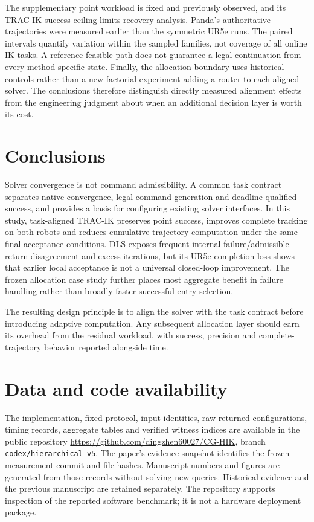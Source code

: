 \documentclass[10pt,a4paper]{article}
\begin{document}
The supplementary point workload is fixed and previously observed, and its
TRAC-IK success ceiling limits recovery analysis. Panda's authoritative
trajectories were measured earlier than the symmetric UR5e runs.
The paired intervals quantify variation within the sampled families, not
coverage of all online IK tasks. A reference-feasible path does not guarantee
a legal continuation from every method-specific state.
Finally, the allocation boundary uses historical controls rather than a new
factorial experiment adding a router to each aligned solver. The conclusions
therefore distinguish directly measured alignment effects from the engineering
judgment about when an additional decision layer is worth its cost.

\section{Conclusions}
\label{sec:conclusions}

Solver convergence is not command admissibility.
A common task contract separates native convergence, legal command generation
and deadline-qualified success, and provides a basis for configuring existing
solver interfaces. In this study, task-aligned TRAC-IK preserves point success,
improves complete tracking on both robots and reduces cumulative trajectory
computation under the same final acceptance conditions. DLS exposes frequent
internal-failure/admissible-return disagreement and excess iterations, but its
UR5e completion loss shows that earlier local acceptance is not a universal
closed-loop improvement. The frozen allocation case study further places most
aggregate benefit in failure handling rather than broadly faster successful
entry selection.

The resulting design principle is to align the solver with the task contract
before introducing adaptive computation. Any subsequent allocation layer should
earn its overhead from the residual workload, with success, precision and
complete-trajectory behavior reported alongside time.

\section*{Data and code availability}

The implementation, fixed protocol, input identities, raw returned configurations,
timing records, aggregate tables and verified witness indices are available in
the public repository \url{https://github.com/dingzhen60027/CG-HIK}, branch
\texttt{codex/hierarchical-v5}. The paper's evidence snapshot identifies the
frozen measurement commit and file hashes. Manuscript numbers and figures are
generated from those records without solving new queries. Historical evidence
and the previous manuscript are retained separately. The repository supports
inspection of the reported software benchmark; it is not a hardware deployment
package.
\end{document}
